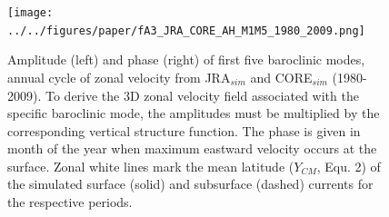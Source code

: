 \documentclass[os, manuscript]{copernicus}
\begin{document}
	\clearpage
	\begin{figure}[t]
		\texttt{[image: ../../figures/paper/fA3\_JRA\_CORE\_AH\_M1M5\_1980\_2009.png]}
		\caption{Amplitude (left) and phase (right) of first five baroclinic modes, annual cycle of zonal velocity from JRA$_{sim}$ and CORE$_{sim}$ (1980-2009). To derive the 3D zonal velocity field associated with the specific baroclinic mode, the amplitudes must be multiplied by the corresponding vertical structure function. The phase is given in month of the year when maximum eastward velocity occurs at the surface. Zonal white lines mark the mean latitude ($ Y_{CM} $, Equ. 2) of the simulated surface (solid) and subsurface (dashed) currents for the respective periods.}
		\label{fig_M1M5_AH_1980_2009}
	\end{figure}    %
	
\end{document}
